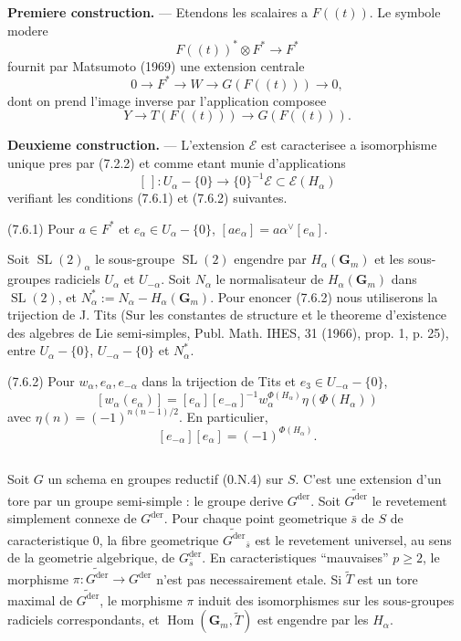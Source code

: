 \documentclass[11pt,a4paper]{article}
\theoremstyle{plain}
\theoremstyle{definition}
\DeclareMathOperator{\Hom}{Hom}
\DeclareMathOperator{\SL}{SL}
\DeclareMathOperator{\der}{der}
\begin{document}
\textbf{Premiere construction.} --- Etendons les scalaires a $F((t))$. Le symbole modere
\[
F((t))^* \otimes F^* \to F^*
\]
fournit par Matsumoto (1969) une extension centrale
\[
0 \to F^* \to W \to G(F((t))) \to 0,
\]
dont on prend l'image inverse par l'application composee
\[
Y \to T(F((t))) \to G(F((t))).
\]

\textbf{Deuxieme construction.} --- L'extension $\mathscr{E}$ est caracterisee a isomorphisme unique pres par (7.2.2) et comme etant munie d'applications
\[
[\,] : U_\alpha - \{0\} \to \{0\}^{-1}\mathscr{E} \subset \mathscr{E}(H_\alpha)
\]
verifiant les conditions (7.6.1) et (7.6.2) suivantes.

(7.6.1) Pour $a \in F^*$ et $e_\alpha \in U_\alpha - \{0\}$, $[a e_\alpha] = a \alpha^{\vee}[e_\alpha]$.

Soit $\SL(2)_\alpha$ le sous-groupe $\SL(2)$ engendre par $H_\alpha(\mathbf{G}_m)$ et les sous-groupes radiciels $U_\alpha$ et $U_{-\alpha}$. Soit $N_\alpha$ le normalisateur de $H_\alpha(\mathbf{G}_m)$ dans $\SL(2)$, et $N_\alpha^* := N_\alpha - H_\alpha(\mathbf{G}_m)$. Pour enoncer (7.6.2) nous utiliserons la trijection de J. Tits (Sur les constantes de structure et le theoreme d'existence des algebres de Lie semi-simples, Publ. Math. IHES, 31 (1966), prop. 1, p. 25), entre $U_\alpha - \{0\}$, $U_{-\alpha} - \{0\}$ et $N_\alpha^*$.

(7.6.2) Pour $w_\alpha, e_\alpha, e_{-\alpha}$ dans la trijection de Tits et $e_3 \in U_{-\alpha} - \{0\}$,
\[
[w_\alpha(e_\alpha)] = [e_\alpha] [e_{-\alpha}]^{-1} w_\alpha^{\Phi(H_\alpha)} \eta(\Phi(H_\alpha))
\]
avec $\eta(n) = (-1)^{n(n-1)/2}$. En particulier,
\[
[e_{-\alpha}] [e_\alpha] = (-1)^{\Phi(H_\alpha)}.
\]

\subsection{}\label{7.7}

Soit $G$ un schema en groupes reductif (0.N.4) sur $S$. C'est une extension d'un tore par un groupe semi-simple : le groupe derive $G^{\der}$. Soit $\widetilde{G^{\der}}$ le revetement simplement connexe de $G^{\der}$. Pour chaque point geometrique $\bar{s}$ de $S$ de caracteristique 0, la fibre geometrique $\widetilde{G^{\der}}_{\bar{s}}$ est le revetement universel, au sens de la geometrie algebrique, de $G^{\der}_{\bar{s}}$. En caracteristiques ``mauvaises'' $p \geq 2$, le morphisme $\pi : \widetilde{G^{\der}} \to G^{\der}$ n'est pas necessairement etale. Si $\widetilde{T}$ est un tore maximal de $\widetilde{G^{\der}}$, le morphisme $\pi$ induit des isomorphismes sur les sous-groupes radiciels correspondants, et $\Hom(\mathbf{G}_m, \widetilde{T})$ est engendre par les $H_\alpha$.
\end{document}
